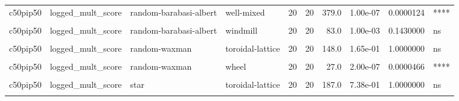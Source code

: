 \documentclass[
]{book}
\begin{document}
\begin{table}
\begin{tabular}{l|l|l|l|r|r|r|r|r|l}
\hline
\cellcolor{gray!6}{c50pip50} & \cellcolor{gray!6}{logged\_mult\_score} & \cellcolor{gray!6}{random-barabasi-albert} & \cellcolor{gray!6}{toroidal-lattice} & \cellcolor{gray!6}{20} & \cellcolor{gray!6}{20} & \cellcolor{gray!6}{34.0} & \cellcolor{gray!6}{9.00e-07} & \cellcolor{gray!6}{0.0001924} & \cellcolor{gray!6}{***}\\
\hline
c50pip50 & logged\_mult\_score & random-barabasi-albert & well-mixed & 20 & 20 & 379.0 & 1.00e-07 & 0.0000124 & ****\\
\hline
\cellcolor{gray!6}{c50pip50} & \cellcolor{gray!6}{logged\_mult\_score} & \cellcolor{gray!6}{random-barabasi-albert} & \cellcolor{gray!6}{wheel} & \cellcolor{gray!6}{20} & \cellcolor{gray!6}{20} & \cellcolor{gray!6}{0.0} & \cellcolor{gray!6}{0.00e+00} & \cellcolor{gray!6}{0.0000000} & \cellcolor{gray!6}{****}\\
\hline
c50pip50 & logged\_mult\_score & random-barabasi-albert & windmill & 20 & 20 & 83.0 & 1.00e-03 & 0.1430000 & ns\\
\hline
\cellcolor{gray!6}{c50pip50} & \cellcolor{gray!6}{logged\_mult\_score} & \cellcolor{gray!6}{random-waxman} & \cellcolor{gray!6}{star} & \cellcolor{gray!6}{20} & \cellcolor{gray!6}{20} & \cellcolor{gray!6}{207.0} & \cellcolor{gray!6}{8.62e-01} & \cellcolor{gray!6}{1.0000000} & \cellcolor{gray!6}{ns}\\
\hline
c50pip50 & logged\_mult\_score & random-waxman & toroidal-lattice & 20 & 20 & 148.0 & 1.65e-01 & 1.0000000 & ns\\
\hline
\cellcolor{gray!6}{c50pip50} & \cellcolor{gray!6}{logged\_mult\_score} & \cellcolor{gray!6}{random-waxman} & \cellcolor{gray!6}{well-mixed} & \cellcolor{gray!6}{20} & \cellcolor{gray!6}{20} & \cellcolor{gray!6}{399.0} & \cellcolor{gray!6}{0.00e+00} & \cellcolor{gray!6}{0.0000000} & \cellcolor{gray!6}{****}\\
\hline
c50pip50 & logged\_mult\_score & random-waxman & wheel & 20 & 20 & 27.0 & 2.00e-07 & 0.0000466 & ****\\
\hline
\cellcolor{gray!6}{c50pip50} & \cellcolor{gray!6}{logged\_mult\_score} & \cellcolor{gray!6}{random-waxman} & \cellcolor{gray!6}{windmill} & \cellcolor{gray!6}{20} & \cellcolor{gray!6}{20} & \cellcolor{gray!6}{234.0} & \cellcolor{gray!6}{3.69e-01} & \cellcolor{gray!6}{1.0000000} & \cellcolor{gray!6}{ns}\\
\hline
c50pip50 & logged\_mult\_score & star & toroidal-lattice & 20 & 20 & 187.0 & 7.38e-01 & 1.0000000 & ns\\
\hline
\cellcolor{gray!6}{c50pip50} & \cellcolor{gray!6}{logged\_mult\_score} & \cellcolor{gray!6}{star} & \cellcolor{gray!6}{well-mixed} & \cellcolor{gray!6}{20} & \cellcolor{gray!6}{20} & \cellcolor{gray!6}{288.0} & \cellcolor{gray!6}{1.70e-02} & \cellcolor{gray!6}{1.0000000} & \cellcolor{gray!6}{ns}\\

\end{tabular}
\end{table}
\end{document}
